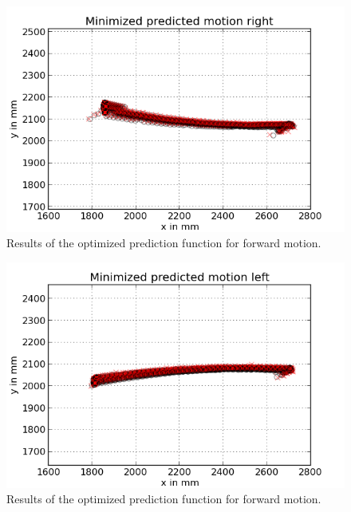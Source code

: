 \documentclass{scrartcl}
\begin{document}
\begin{figure}[H]
\centering
\begin{minipage}{.5\textwidth}
  \centering
  \includegraphics[width=1\linewidth]{img/mini_predict_right_1.png}
\end{minipage}%

\caption{Results of the optimized prediction function for forward motion. }
\label{fig:prediction}
\end{figure}

\begin{figure}[H]
\centering
\begin{minipage}{.5\textwidth}
  \centering
  \includegraphics[width=1\linewidth]{img/mini_predict_left_1.png}
\end{minipage}%

\caption{Results of the optimized prediction function for forward motion. }
\label{fig:prediction}
\end{figure}
\end{document}
